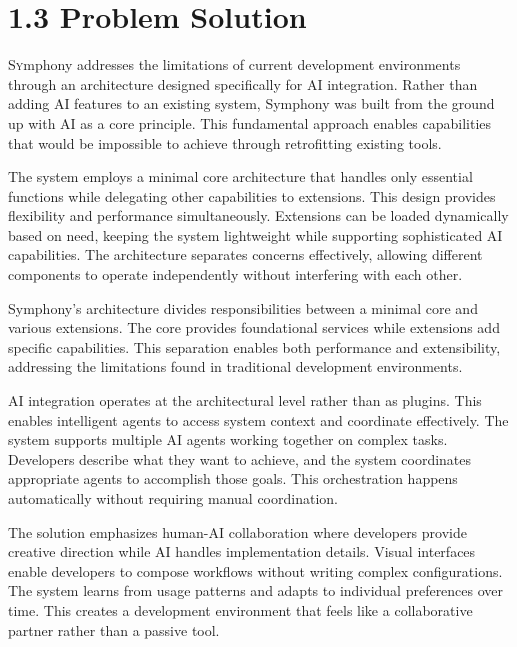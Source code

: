 \clearpage
\section{1.3 Problem Solution}
\label{sec:solution}

\lettrine{S}ymphony addresses the limitations of current development environments through an architecture designed specifically for AI integration. Rather than adding AI features to an existing system, Symphony was built from the ground up with AI as a core principle. This fundamental approach enables capabilities that would be impossible to achieve through retrofitting existing tools.

The system employs a minimal core architecture that handles only essential functions while delegating other capabilities to extensions. This design provides flexibility and performance simultaneously. Extensions can be loaded dynamically based on need, keeping the system lightweight while supporting sophisticated AI capabilities. The architecture separates concerns effectively, allowing different components to operate independently without interfering with each other.

Symphony's architecture divides responsibilities between a minimal core and various extensions. The core provides foundational services while extensions add specific capabilities. This separation enables both performance and extensibility, addressing the limitations found in traditional development environments.

AI integration operates at the architectural level rather than as plugins. This enables intelligent agents to access system context and coordinate effectively. The system supports multiple AI agents working together on complex tasks. Developers describe what they want to achieve, and the system coordinates appropriate agents to accomplish those goals. This orchestration happens automatically without requiring manual coordination.

The solution emphasizes human-AI collaboration where developers provide creative direction while AI handles implementation details. Visual interfaces enable developers to compose workflows without writing complex configurations. The system learns from usage patterns and adapts to individual preferences over time. This creates a development environment that feels like a collaborative partner rather than a passive tool.
